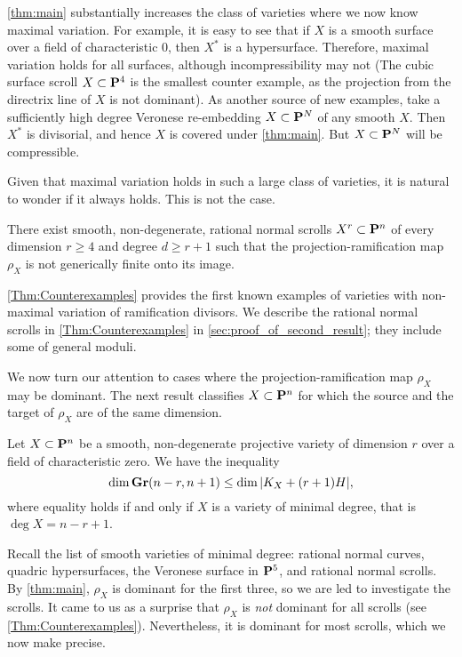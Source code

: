 \documentclass[11pt,reqno]{amsart}
\theoremstyle{plain}
\theoremstyle{definition}
\theoremstyle{remark}
\numberwithin{equation}{section}
\numberwithin{equation}{section}
\begin{document}
\autoref{thm:main} substantially increases the class of varieties where we now know maximal variation.
For example, it is easy to see that if $X$ is a smooth surface over a field of characteristic $0$, then $X^*$ is a hypersurface.
Therefore, maximal variation holds for all surfaces, although incompressibility may not (The cubic surface scroll $X \subset \P^4$ is the smallest counter example, as the projection from the directrix line of $X$ is not dominant).
As another source of new examples, take a sufficiently high degree Veronese re-embedding $X \subset \P^N$ of any smooth $X$.
Then $X^*$ is divisorial, and hence $X$ is covered under \autoref{thm:main}.
But $X \subset \P^N$ will be compressible.

Given that maximal variation holds in such a large class of varieties, it is natural to wonder if it always holds.
This is not the case.
\begin{maintheorem}
  \label{Thm:Counterexamples}
  There exist smooth, non-degenerate, rational normal scrolls $X^{r} \subset \P^{n}$ of every dimension $r \geq 4$ and degree $d \geq r+1$ such that the projection-ramification map $\rho_{X}$ is not generically finite onto its image.
\end{maintheorem}
\autoref{Thm:Counterexamples} provides the first known examples of varieties with non-maximal variation of ramification divisors.
We describe the rational normal scrolls in \autoref{Thm:Counterexamples} in \autoref{sec:proof_of_second_result}; they include some of general moduli.

We now turn our attention to cases where the projection-ramification map $\rho_X$ may be dominant.
The next result classifies $X \subset \P^n$ for which the source and the target of $\rho_X$ are of the same dimension.
\begin{maintheorem}\label{theorem:minimaldegree}
  Let $X \subset \P^{n}$ be a smooth, non-degenerate projective variety of dimension $r$ over a field of characteristic zero.
  We have the inequality
  \[ \dim \Gr(n-r, n+1) \leq \dim |K_X + (r+1)H|,\]
  where equality holds if and only if $X$ is a variety of minimal degree, that is $\deg X = n-r+1$.
\end{maintheorem}
Recall the list of smooth varieties of minimal degree: rational normal curves, quadric hypersurfaces, the Veronese surface in $\P^5$, and rational normal scrolls.
By \autoref{thm:main}, $\rho_X$ is dominant for the first three, so we are led to investigate the scrolls.
It came to us as a surprise that $\rho_X$ is \emph{not} dominant for all scrolls (see \autoref{Thm:Counterexamples}).
Nevertheless, it is dominant for most scrolls, which we now make precise.
\end{document}
